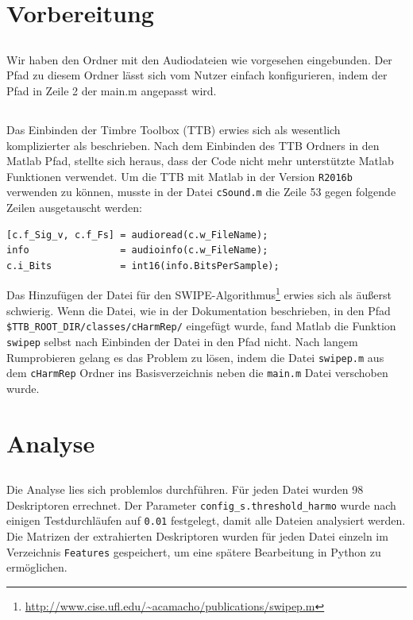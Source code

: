 \section{Vorbereitung}
\label{sec:preperation}

\subsection{}
Wir haben den Ordner mit den Audiodateien wie vorgesehen eingebunden.
Der Pfad zu diesem Ordner lässt sich vom Nutzer einfach konfigurieren, indem der Pfad in Zeile 2 der main.m angepasst wird.

\subsection{}
Das Einbinden der Timbre Toolbox (TTB) erwies sich als wesentlich komplizierter als beschrieben.
Nach dem Einbinden des TTB Ordners in den Matlab Pfad, stellte sich heraus, dass der Code nicht mehr unterstützte Matlab Funktionen verwendet.
Um die TTB mit Matlab in der Version \texttt{R2016b} verwenden zu können, musste in der Datei \texttt{cSound.m} die Zeile 53 gegen folgende Zeilen ausgetauscht werden:

\begin{lstlisting}
[c.f_Sig_v, c.f_Fs] = audioread(c.w_FileName);
info                = audioinfo(c.w_FileName);
c.i_Bits            = int16(info.BitsPerSample);
\end{lstlisting}

Das Hinzufügen der Datei für den SWIPE-Algorithmus\footnote{\url{http://www.cise.ufl.edu/~acamacho/publications/swipep.m}} erwies sich als äußerst schwierig.
Wenn die Datei, wie in der Dokumentation beschrieben, in den Pfad \texttt{\$TTB\_ROOT\_DIR/classes/cHarmRep/} eingefügt wurde, fand Matlab die Funktion \texttt{swipep} selbst nach Einbinden der Datei in den Pfad nicht.
Nach langem Rumprobieren gelang es das Problem zu lösen, indem die Datei \texttt{swipep.m} aus dem \texttt{cHarmRep} Ordner ins Basisverzeichnis neben die \texttt{main.m} Datei verschoben wurde.

\section{Analyse}
\label{sec:analyse}

\subsection{}
Die Analyse lies sich problemlos durchführen.
Für jeden Datei wurden 98 Deskriptoren errechnet.	
Der Parameter \texttt{config\_s.threshold\_harmo} wurde nach einigen Testdurchläufen auf \texttt{0.01} festgelegt, damit alle Dateien analysiert werden.
Die Matrizen der extrahierten Deskriptoren wurden für jeden Datei einzeln im Verzeichnis \texttt{Features} gespeichert, um eine spätere Bearbeitung in Python zu ermöglichen. 


